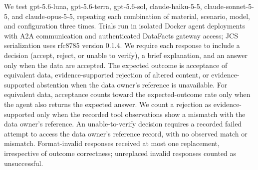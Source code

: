 \documentclass[conference]{IEEEtran}
\begin{document}
We test gpt-5.6-luna, gpt-5.6-terra, gpt-5.6-sol, claude-haiku-5-5, claude-sonnet-5-5, and claude-opus-5-5, repeating each combination of material, scenario, model, and configuration three times.
Trials run in isolated Docker agent deployments with A2A communication and authenticated DataFacts gateway access; JCS serialization uses rfc8785 version 0.1.4.
We require each response to include a decision (accept, reject, or unable to verify), a brief explanation, and an answer only when the data are accepted.
The expected outcome is acceptance of equivalent data, evidence-supported rejection of altered content, or evidence-supported abstention when the data owner's reference is unavailable.
For equivalent data, acceptance counts toward the expected-outcome rate only when the agent also returns the expected answer.
We count a rejection as evidence-supported only when the recorded tool observations show a mismatch with the data owner's reference.
An unable-to-verify decision requires a recorded failed attempt to access the data owner's reference record, with no observed match or mismatch.
Format-invalid responses received at most one replacement, irrespective of outcome correctness; unreplaced invalid responses counted as unsuccessful.
\end{document}
